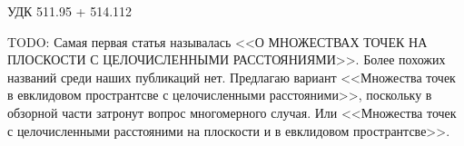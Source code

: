 



%

УДК 511.95 + 514.112





TODO: Самая первая статья называлась <<О МНОЖЕСТВАХ ТОЧЕК НА ПЛОСКОСТИ С ЦЕЛОЧИСЛЕННЫМИ РАССТОЯНИЯМИ>>.
Более похожих названий среди наших публикаций нет.
Предлагаю вариант <<Множества точек в евклидовом пространтсве с целочисленными расстояними>>,
поскольку в обзорной части затронут вопрос многомерного случая.
Или <<Множества точек с целочисленными расстояними на плоскости и в евклидовом пространтсве>>.

	\setcounter{equation}{0}
	\setcounter{figure}{0}
	\setcounter{table}{0}
	\setcounter{footnote}{0}
	\renewcommand{\theenumi}{\arabic{enumi}}
	\renewcommand{\labelenumi}{\theenumi)}



%

\\
\\

